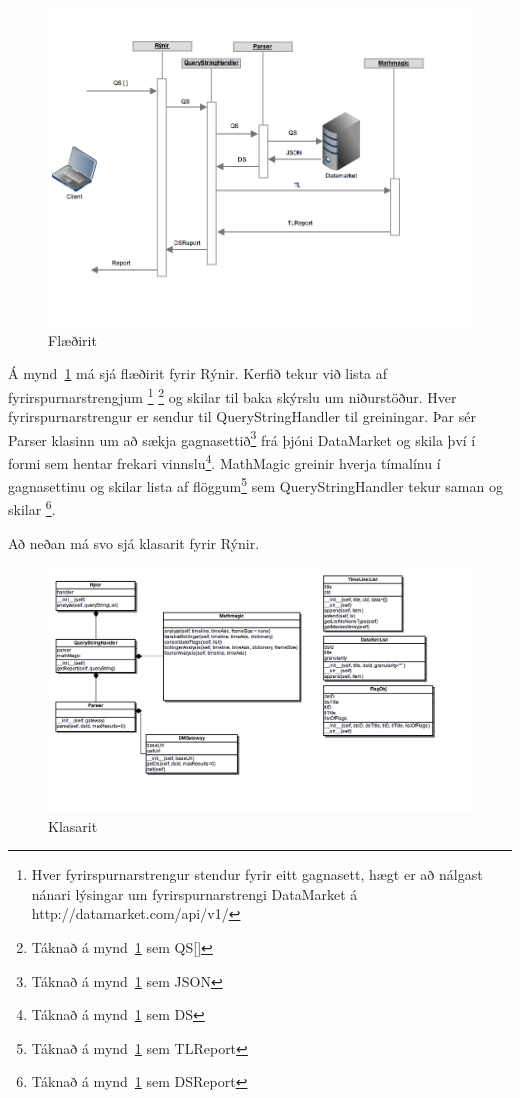 \documentclass{article}
\begin{document}
\begin{figure}[H]
  \centering
  \includegraphics[width=.85\textwidth]{rynir_sequence-2.png} 
  \caption{Flæðirit} 
  \label{fig:sequence}
\end{figure}
Á mynd~\ref{fig:sequence} má sjá flæðirit fyrir Rýnir.
Kerfið tekur við lista af fyrirspurnarstrengjum
\footnote[1]{Hver fyrirspurnarstrengur stendur fyrir eitt gagnasett, hægt er að nálgast nánari lýsingar um fyrirspurnarstrengi DataMarket á http://datamarket.com/api/v1/}
\footnote[2]{Táknað á mynd~\ref{fig:sequence} sem QS[]} 
og skilar til baka skýrslu um niðurstöður. Hver fyrirspurnarstrengur er sendur til QueryStringHandler til greiningar.
Þar sér Parser klasinn um að sækja gagnasettið\footnote[3]{Táknað á mynd~\ref{fig:sequence} sem JSON} frá þjóni DataMarket
og skila því í formi sem hentar frekari vinnslu\footnote[4]{Táknað á mynd~\ref{fig:sequence} sem DS}.
MathMagic greinir hverja tímalínu í gagnasettinu og skilar lista af flöggum\footnote[4]{Táknað á mynd~\ref{fig:sequence} sem TLReport} 
sem QueryStringHandler tekur saman og skilar \footnote[4]{Táknað á mynd~\ref{fig:sequence} sem DSReport}.

Að neðan má svo sjá klasarit fyrir Rýnir.

\begin{figure}[H]
  \centering
  \includegraphics[width=.95\textwidth]{rynir_class_diagram.png} 
  \caption{Klasarit} 
\end{figure}
\newpage
\end{document}
